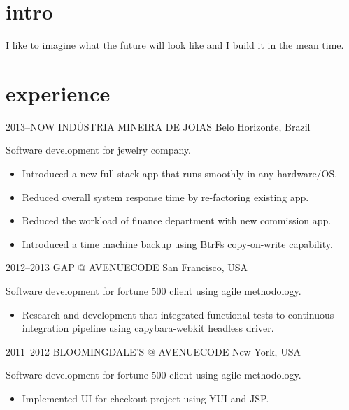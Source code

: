 \documentclass[]{friggeri-cv}
\begin{document}
\section{intro}

I like to imagine what the future will look like and I build it in the mean time.

\section{experience}
\begin{entrylist}


\entry
{2013--NOW}
{INDÚSTRIA MINEIRA DE JOIAS}
{Belo Horizonte, Brazil}
{ Software development for jewelry company.  

  \begin{itemize}
    \item Introduced a new full stack app that runs smoothly in any hardware/OS. 
    \item Reduced overall system response time by re-factoring existing app.  
    \item Reduced the workload of finance department with new commission app.
    \item Introduced a time machine backup using BtrFs copy-on-write capability. 
  \end{itemize}
  }


\entry
{2012--2013}
{GAP @ AVENUECODE}
{San Francisco, USA}
{ Software development for fortune 500 client using agile methodology.  
  \begin{itemize}
    \item Research and development that integrated functional tests to continuous integration pipeline using capybara-webkit headless driver.
  \end{itemize}
}


\entry
{2011--2012}
{BLOOMINGDALE'S @ AVENUECODE}
{New York, USA}
{ Software development for fortune 500 client using agile methodology.

  \begin{itemize}
    \item Implemented UI for checkout project using YUI and JSP.
  \end{itemize}
}


\end{entrylist}
\end{document}

